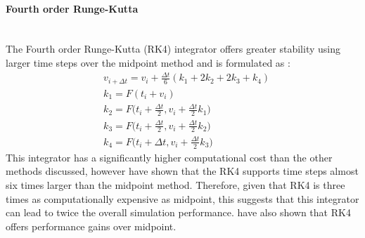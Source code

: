 \paragraph{Fourth order Runge-Kutta}\leavevmode\\
The Fourth order Runge-Kutta (RK4) integrator offers greater stability using larger time steps over the midpoint method and is formulated as \parencite[3]{Wang2009a}:
\begin{equation}
\begin{split}
\label{eq:4th order rk}
  &v_{i + \Delta t} = v_{i} + \frac{\Delta t}{6}(k_{1} + 2k_{2} + 2k_{3} +  k_{4})
  \\&k_{1} = F(t_{i} + v_{i})
  \\&k_{2} = F\bigg(t_{i} + \frac{\Delta t}{2}, v_{i} + \frac{\Delta t}{2}k_{1}\bigg)
  \\&k_{3} = F\bigg(t_{i} + \frac{\Delta t}{2}, v_{i} + \frac{\Delta t}{2}k_{2}\bigg)
  \\&k_{4} = F\bigg(t_{i} + \Delta t, v_{i} + \frac{\Delta t}{2}k_{3}\bigg)
\end{split}
\end{equation}
This integrator has a significantly higher computational cost than the other methods discussed, however \textcite[4]{Volino2001} have shown that the RK4 supports time steps almost six times larger than the midpoint method. Therefore, given that RK4 is three times as computationally expensive as midpoint, this suggests that this integrator can lead to twice the overall simulation performance. \textcite[4]{Wang2009a} have also shown that RK4 offers performance gains over midpoint.

